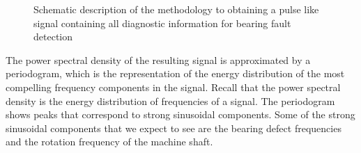 \documentclass[../Main/thesis.tex]{subfiles}
\begin{document}
\begin{figure}[H]
  \caption{Schematic description of the methodology to obtaining a pulse like signal containing all diagnostic information for bearing fault detection}
   \label{fig:pulse}
\end{figure}
\justify
The power spectral density of the resulting signal is approximated by a periodogram, which is the representation of the energy distribution of the most compelling frequency components in the signal. Recall that the power spectral density is the energy distribution of frequencies of a signal. The periodogram shows peaks that correspond to strong sinusoidal components. Some of the strong sinusoidal components that we expect to see are the bearing defect frequencies and the rotation frequency of the machine shaft.
\end{document}

